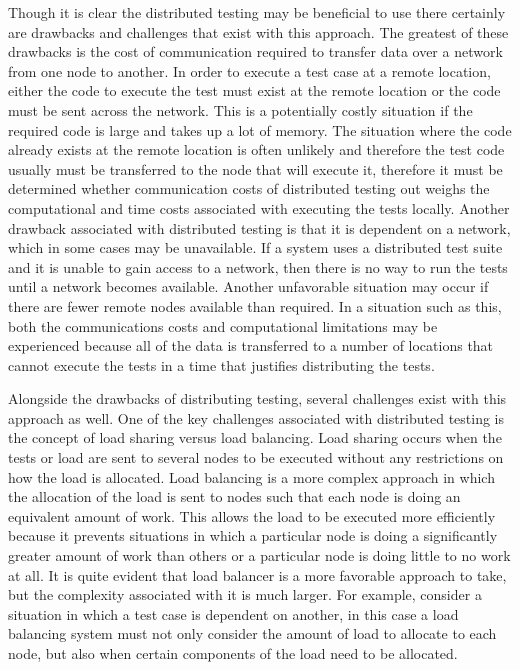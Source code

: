 \documentclass{article}
\begin{document}
{Though it is clear the distributed testing may be beneficial to use there certainly are drawbacks and challenges that exist with this approach. The greatest of these drawbacks is the cost of communication required to transfer data over a network from one node to another. In order to execute a test case at a remote location, either the code to execute the test must exist at the remote location or the code must be sent across the network. This is a potentially costly situation if the required code is large and takes up a lot of memory. The situation where the code already exists at the remote location is often unlikely and therefore the test code usually must be transferred to the node that will execute it, therefore it must be determined whether communication costs of distributed testing out weighs the computational and time costs associated with executing the tests locally. Another drawback associated with distributed testing is that it is dependent on a network, which in some cases may be unavailable. If a system uses a distributed test suite and it is unable to gain access to a network, then there is no way to run the tests until a network becomes available. Another unfavorable situation may occur if there are fewer remote nodes available than required. In a situation such as this, both the communications costs and computational limitations may be experienced because all of the data is transferred to a number of locations that cannot execute the tests in a time that justifies distributing the tests.

Alongside the drawbacks of distributing testing, several challenges exist with this approach as well. One of the key challenges associated with distributed testing is the concept of load sharing versus load balancing. Load sharing occurs when the tests or load are sent to several nodes to be executed without any restrictions on how the load is allocated. Load balancing is a more complex approach in which the allocation of the load is sent to nodes such that each node is doing an equivalent amount of work. This allows the load to be executed more efficiently because it prevents situations in which a particular node is doing a significantly greater amount of work than others or a particular node is doing little to no work at all. It is quite evident that load balancer is a more favorable approach to take, but the complexity associated with it is much larger. For example, consider a situation in which a test case is dependent on another, in this case a load balancing system must not only consider the amount of load to allocate to each node, but also when certain components of the load need to be allocated. 

}
\end{document}
